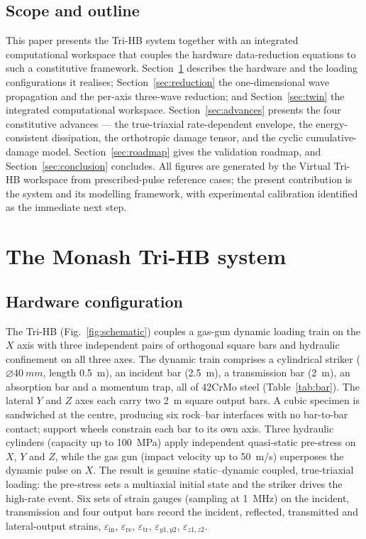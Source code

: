 \documentclass[sn-basic]{sn-jnl}
\providecommand{\SI}[2]{\qty{#1}{#2}}
\providecommand{\diameter}{\ensuremath{\varnothing}}
\newcommand{\eps}{\varepsilon}
\begin{document}
\subsection{Scope and outline}

This paper presents the Tri-HB system together with an integrated computational workspace
that couples the hardware data-reduction equations to such a constitutive
framework. Section~\ref{sec:system} describes the hardware and the loading
configurations it realises; Section~\ref{sec:reduction} the one-dimensional wave
propagation and the per-axis three-wave reduction; and
Section~\ref{sec:twin} the integrated computational workspace. Section~\ref{sec:advances} presents the four constitutive advances --- the
true-triaxial rate-dependent envelope, the energy-consistent dissipation, the
orthotropic damage tensor, and the cyclic cumulative-damage model. Section~\ref{sec:roadmap} gives the validation roadmap,
and Section~\ref{sec:conclusion} concludes. All figures are generated by the
Virtual Tri-HB workspace from prescribed-pulse reference cases; the present
contribution is the system and its modelling framework, with experimental
calibration identified as the immediate next step.

\section{The Monash Tri-HB system}\label{sec:system}

\subsection{Hardware configuration}

The Tri-HB (Fig.~\ref{fig:schematic}) couples a gas-gun dynamic loading train on
the $X$ axis with three independent pairs of orthogonal square bars and hydraulic
confinement on all three axes. The dynamic train comprises a cylindrical striker
($\diameter\SI{40}{mm}$, length \SI{0.5}{m}), an incident bar (\SI{2.5}{m}), a
transmission bar (\SI{2}{m}), an absorption bar and a momentum trap, all of
42CrMo steel (Table~\ref{tab:bar}). The lateral $Y$ and $Z$ axes each carry two
\SI{2}{m} square output bars. A cubic specimen is sandwiched at the centre,
producing six rock--bar interfaces with no bar-to-bar contact; support wheels
constrain each bar to its own axis. Three hydraulic cylinders (capacity up to
\SI{100}{MPa}) apply independent quasi-static pre-stress on $X$, $Y$ and $Z$,
while the gas gun (impact velocity up to \SI{50}{m/s}) superposes the dynamic
pulse on $X$. The result is genuine static--dynamic coupled, true-triaxial
loading: the pre-stress sets a multiaxial initial state and the striker drives
the high-rate event. Six sets of strain gauges (sampling at \SI{1}{MHz}) on the
incident, transmission and four output bars record the incident, reflected,
transmitted and lateral-output strains, $\eps_{\mathrm{in}}$, $\eps_{\mathrm{re}}$,
$\eps_{\mathrm{tr}}$, $\eps_{y1,y2}$, $\eps_{z1,z2}$.
\end{document}
